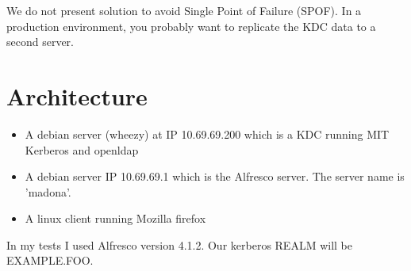 \documentclass[12pt,a4]{article}
\begin{document}
We do not present solution to avoid Single Point of Failure (SPOF). In a production environment, you probably want to replicate the KDC data to a second server.
\section{Architecture}

\begin{itemize}
\item A debian server (wheezy) at IP 10.69.69.200 which is a KDC running MIT Kerberos and openldap
\item A debian server IP 10.69.69.1 which is the Alfresco server. The server name is 'madona'.
\item A linux client running Mozilla firefox
\end{itemize}
In my tests I used Alfresco version 4.1.2.
Our kerberos REALM will be EXAMPLE.FOO.
\end{document}
